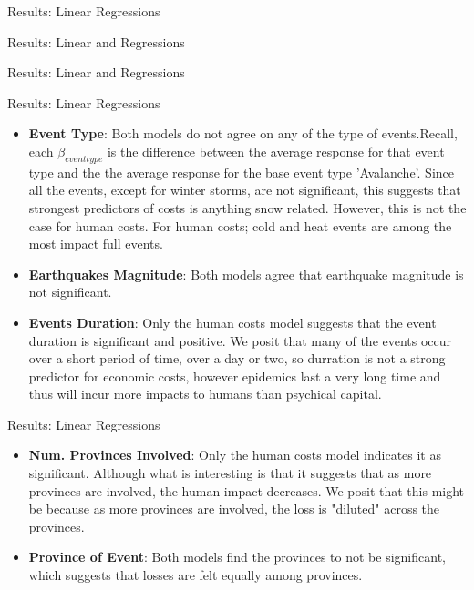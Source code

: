 \begin{frame}{Results: Linear Regressions}
    
\end{frame}
\begin{frame}{Results: Linear and Regressions}
	
\end{frame}
\begin{frame}{Results: Linear and Regressions}

\end{frame}

\begin{frame}{Results: Linear Regressions}
\begin{itemize}
	\item \textbf{Event Type}: Both models do not agree on any of the type of events.Recall, each $\beta_{event type}$ is the difference between the average response for that event type and the the average response for the base event type 'Avalanche'. Since all the events, except for winter storms, are not significant, this suggests that strongest predictors of costs is anything snow related. However, this is not the case for human costs. For human costs; cold and heat events are among the most impact full events.
\item \textbf{Earthquakes Magnitude}: Both models agree that earthquake magnitude is not significant.
\item \textbf{Events Duration}: Only the human costs model suggests that the event duration is significant and positive. We posit that many of the events occur over a short period of time, over a day or two, so durration is not a strong predictor for economic costs, however epidemics last a very long time and thus will incur more impacts to humans than psychical capital.
\end{itemize}
\end{frame}

\begin{frame}{Results: Linear Regressions}
\begin{itemize}
	\item \textbf{Num. Provinces Involved}: Only the human costs model indicates it as significant. Although what is interesting is that it suggests that as more provinces are involved, the human impact decreases. We posit that this might be because as more provinces are involved, the loss is "diluted" across the provinces.
	\item \textbf{Province of Event}: Both models find the provinces to not be significant, which suggests that losses are felt equally among provinces.
\end{itemize}
\end{frame}

